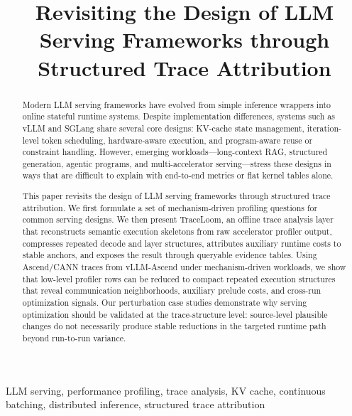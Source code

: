 \documentclass[conference]{IEEEtran}
\begin{document}
\title{Revisiting the Design of LLM Serving Frameworks through Structured Trace Attribution}

\author{
}

\maketitle

\begin{abstract}
Modern LLM serving frameworks have evolved from simple inference wrappers into
online stateful runtime systems. Despite implementation differences, systems
such as vLLM and SGLang share several core designs: KV-cache state management,
iteration-level token scheduling, hardware-aware execution, and program-aware
reuse or constraint handling. However, emerging workloads---long-context RAG,
structured generation, agentic programs, and multi-accelerator serving---stress
these designs in ways that are difficult to explain with end-to-end metrics or
flat kernel tables alone.

This paper revisits the design of LLM serving frameworks through structured
trace attribution. We first formulate a set of mechanism-driven profiling
questions for common serving designs. We then present TraceLoom, an offline
trace analysis layer that reconstructs semantic execution skeletons from raw
accelerator profiler output, compresses repeated decode and layer structures,
attributes auxiliary runtime costs to stable anchors, and exposes the result
through queryable evidence tables. Using Ascend/CANN traces from vLLM-Ascend
under mechanism-driven workloads, we show that low-level profiler rows can be
reduced to compact repeated execution structures that reveal communication
neighborhoods, auxiliary prelude costs, and cross-run optimization signals.
Our perturbation case studies demonstrate why serving optimization should be
validated at the trace-structure level: source-level plausible changes do not
necessarily produce stable reductions in the targeted runtime path beyond
run-to-run variance.
\end{abstract}

\begin{IEEEkeywords}
LLM serving, performance profiling, trace analysis, KV cache, continuous
batching, distributed inference, structured trace attribution
\end{IEEEkeywords}
\end{document}
